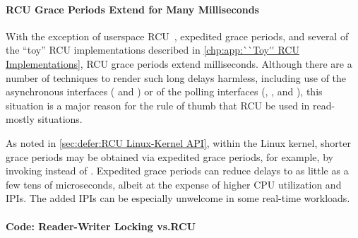 \QuickQuizEnd

\paragraph{RCU Grace Periods Extend for Many Milliseconds}

With the exception of userspace
RCU~\cite{MathieuDesnoyers2009URCU,PaulMcKenney2013LWNURCU},
expedited grace periods, and several of the ``toy''
RCU implementations described in
\cref{chp:app:``Toy'' RCU Implementations},
RCU grace periods extend milliseconds.
Although there are a number of techniques to render such long
delays harmless, including use of the asynchronous interfaces
( and ) or of the polling interfaces
(, ,
and ), this situation is a major reason
for the rule of thumb that RCU be used in read-mostly situations.

As noted in \cref{sec:defer:RCU Linux-Kernel API}, within the Linux
kernel, shorter grace periods may be obtained via expedited grace
periods, for example, by invoking 
instead of .
Expedited grace periods can reduce delays to as little as a few tens of
microseconds, albeit at the expense of higher CPU utilization and IPIs.
The added IPIs can be especially unwelcome in some real-time workloads.

\paragraph{Code:
		 Reader-Writer Locking vs.\@ RCU}

